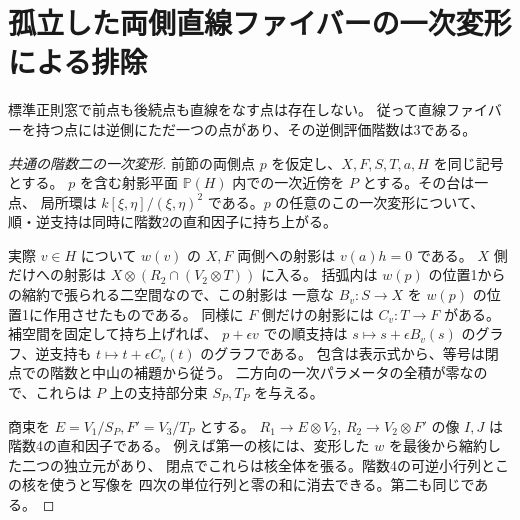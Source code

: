 \section{孤立した両側直線ファイバーの一次変形による排除}
\label{sec:exclude-two-sided-centers}
\begin{theorem}\label{thm:no-two-sided-centers}
標準正則窓で前点も後続点も直線をなす点は存在しない。
従って直線ファイバーを持つ点には逆側にただ一つの点があり、その逆側評価階数は3である。
\end{theorem}
\begin{proof}[共通の階数二の一次変形]
前節の両側点 $p$ を仮定し、$X,F,S,T,a,H$ を同じ記号とする。
$p$ を含む射影平面 $\mathbb P(H)$ 内での一次近傍を $P$ とする。その台は一点、
局所環は $k[\xi,\eta]/(\xi,\eta)^2$ である。$p$ の任意のこの一次変形について、
順・逆支持は同時に階数2の直和因子に持ち上がる。

実際 $v\in H$ について $w(v)$ の $X,F$ 両側への射影は $v(a)h=0$ である。
$X$ 側だけへの射影は $X\otimes(R_2\cap(V_2\otimes T))$ に入る。
括弧内は $w(p)$ の位置1からの縮約で張られる二空間なので、この射影は
一意な $B_v:S\to X$ を $w(p)$ の位置1に作用させたものである。
同様に $F$ 側だけの射影には $C_v:T\to F$ がある。補空間を固定して持ち上げれば、
$p+\epsilon v$ での順支持は $s\mapsto s+\epsilon B_v(s)$ のグラフ、逆支持も
$t\mapsto t+\epsilon C_v(t)$ のグラフである。
包含は表示式から、等号は閉点での階数と中山の補題から従う。
二方向の一次パラメータの全積が零なので、これらは $P$ 上の支持部分束 $S_P,T_P$ を与える。

商束を $E=V_1/S_P,F'=V_3/T_P$ とする。
$R_1\to E\otimes V_2$, $R_2\to V_2\otimes F'$ の像 $I,J$ は階数4の直和因子である。
例えば第一の核には、変形した $w$ を最後から縮約した二つの独立元があり、
閉点でこれらは核全体を張る。階数4の可逆小行列とこの核を使うと写像を
四次の単位行列と零の和に消去できる。第二も同じである。
\end{proof}

